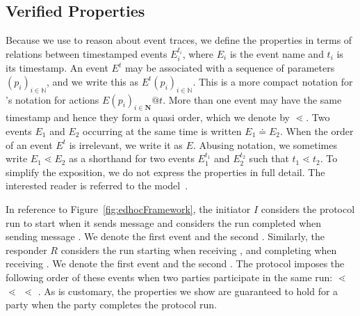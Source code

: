 \subsection{Verified Properties}
\label{sec:desired-properties}
Because we use \mTamarin{} to reason about event traces, we define the
properties in terms of relations between timestamped events $E_i^{t_i}$, where
$E_i$ is the event name and $t_i$ is its timestamp.
%
An event $E^t$ may be associated with a sequence of parameters
$(p_i)_{i\in\mathbb{N}}$, and we write this as $E^t(p_i)_{i\in\mathbb{N}}$.
%
This is a more compact notation for \mTamarin{}'s notation for
actions $E(p_i)_{i\in\mathbf{N}}@t$.
%
More than one event may have the same timestamp and hence they form a quasi
order, which we denote by $\lessdot$.
%
Two events $E_1$ and $E_2$ occurring at the same time is written
$E_1 \doteq E_2$.
%
When the order of an event $E^t$ is irrelevant, we write it as $E$.
%
Abusing notation, we sometimes write $E_1 \lessdot E_2$ as a shorthand for
two events $E_1^{t_1}$ and $E_2^{t_2}$ such that $t_1 \lessdot t_2$.
%
To simplify the exposition, we do not express the properties in full detail.
%
The interested reader is referred to the \mTamarin{}
model~\cite{edhocTamarinRepo}.
%

In reference to Figure~\ref{fig:edhocFramework}, the initiator $I$ considers the
protocol run to start when it sends message \mMsgone{} and considers the run
completed when sending message \mMsgthree{}.
%
We denote the first event \mIStart{} and the second \mIComplete{}.
%
Similarly, the responder $R$ considers the run starting when receiving
\mMsgone{}, and completing when receiving \mMsgthree{}.
%
We denote the first event \mRStart{} and the second \mRComplete{}.
%
The protocol imposes the following order of these events when two parties
participate in the same run:
\mIStart{} $\lessdot$ \mRStart{} $\lessdot$ \mIComplete{}
$\lessdot$ \mRComplete{}.
%
As is customary, the properties we show are guaranteed to hold for a party when
the party completes the protocol run.
%

